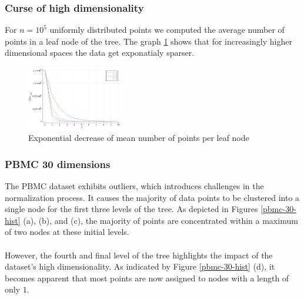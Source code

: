 \documentclass{juliacon}
\begin{document}
\subsubsection{Curse of high dimensionality}
For $n=10^5$ uniformly distributed points we computed the average number of points in a
leaf node of the tree. The graph \ref{b_vs_d} shows that for increasingly higher
dimensional spaces the data get exponatialy sparser.

\begin{figure}[!ht]
  \centerline{
    \includegraphics[width=10pc]{figures/experiments/b_vs_d.png}
  }
  \caption{ Exponential decrease of mean number of points per leaf node }
  \label{b_vs_d}
\end{figure}


\subsubsection{PBMC 30 dimensions}

The PBMC dataset exhibits outliers, which introduces challenges in the
normalization process. It causes the majority of data points to be clustered
into a single node for the first three levels of the tree. As depicted in
Figures \ref{pbmc-30-hist} (a), (b), and (c), the majority of points are
concentrated within a maximum of two nodes at these initial levels.
\\\\
However, the fourth and final level of the tree highlights the impact of the
dataset's high dimensionality. As indicated by Figure \ref{pbmc-30-hist} (d),
it becomes apparent that most points are now assigned to nodes with a length of
only $1$.
\end{document}
